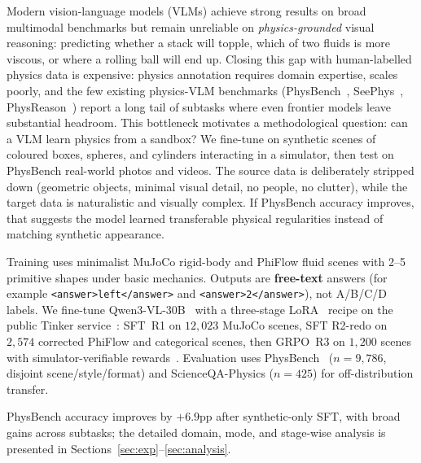 \documentclass{article}
\begin{document}
Modern vision-language models (VLMs) achieve strong results on
broad multimodal benchmarks but remain unreliable on
\emph{physics-grounded} visual reasoning: predicting whether a stack
will topple, which of two fluids is more viscous, or where a rolling
ball will end up. Closing this gap with human-labelled physics data
is expensive: physics annotation requires domain expertise, scales
poorly, and the few existing physics-VLM benchmarks (PhysBench~\cite{physbench2024},
SeePhys~\cite{seephys2025}, PhysReason~\cite{physreason2025})
report a long tail of subtasks where even frontier models leave
substantial headroom. This bottleneck
motivates a methodological question: can a VLM learn physics from
a sandbox? We fine-tune on synthetic scenes
of coloured boxes, spheres, and cylinders interacting in a
simulator, then test on PhysBench real-world photos and videos.
The source data is deliberately stripped down (geometric objects,
minimal visual detail, no people, no clutter), while the target
data is naturalistic and visually complex. If PhysBench accuracy
improves, that suggests the model learned transferable physical
regularities instead of matching synthetic appearance.

Training uses minimalist MuJoCo rigid-body and PhiFlow
fluid scenes with 2--5 primitive shapes under basic mechanics. Outputs
are \textbf{free-text} answers (for example
\texttt{<answer>left</answer>} and \texttt{<answer>2</answer>}), not
A/B/C/D labels. We fine-tune Qwen3-VL-30B~\cite{qwen3vl2025} with a
three-stage LoRA~\cite{lora2022} recipe on the public Tinker
service~\cite{tinker2025}: SFT~R1 on $12{,}023$ MuJoCo scenes, SFT
R2-redo on $2{,}574$ corrected PhiFlow and categorical scenes, then
GRPO~R3 on $1{,}200$ scenes with simulator-verifiable
rewards~\cite{deepseekmath2024}. Evaluation uses
PhysBench~\cite{physbench2024} ($n{=}9{,}786$, disjoint
scene/style/format) and ScienceQA-Physics ($n{=}425$) for
off-distribution transfer.

PhysBench accuracy improves by $+6.9$pp after synthetic-only SFT,
with broad gains across subtasks; the detailed domain, mode, and
stage-wise analysis is presented in
Sections~\ref{sec:exp}--\ref{sec:analysis}.
\end{document}
